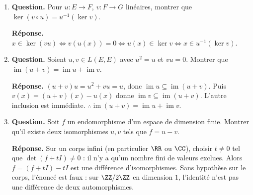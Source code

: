 \documentclass[12pt, a4paper]{article}
\begin{document}
\begin{enumerate}[label=7.\arabic*., start=68]
\begin{minipage}[t]{\linewidth}
\begin{enumerate}[\arabic*.]
En caractéristique $p\leq n$, la question 3 est fausse : $X^p$ est dans le noyau et vérifie $P(0)=P'(0)=0$.
    Pour préciser le noyau et le rang, poser $H=X^p-X$ et $d_q=\min(p,n-pq+1)$, $0\leq q\leq\lfloor n/p\rfloor$.
    Les blocs $H^q\operatorname{Vect}(1,X,\ldots,X^{d_q-1})$ sont stables.
    Si $p>2$, le noyau a pour base les $H^q$, ainsi que les $XH^q$ lorsque $d_q\geq2$ ; l'image a pour base les $X^rH^q$ avec $0\leq r\leq d_q-3$.
    Donc $\operatorname{rg}f=\sum_q\max(d_q-2,0)$.
    Si $p=2$, $f=0$ car $X+1=X-1$.

\end{enumerate}
\end{minipage}

  \item \begin{minipage}[t]{\linewidth}\raggedright
\textbf{Question.} Pour $u:E\to F$, $v:F\to G$ linéaires, montrer que $\ker(v\circ u)=u^{-1}(\ker v)$.
\par\smallskip
\textbf{Réponse.} $x\in\ker(vu)\iff v(u(x))=0\iff u(x)\in\ker v\iff x\in u^{-1}(\ker v)$.
\end{minipage}

  \item \begin{minipage}[t]{\linewidth}\raggedright
\textbf{Question.} Soient $u,v\in L(E,E)$ avec $u^2=u$ et $vu=0$. Montrer que $\operatorname{im}(u+v)=\operatorname{im}u+\operatorname{im}v$.
\par\smallskip
\textbf{Réponse.} $(u+v)u=u^2+vu=u$, donc $\operatorname{im}u\subseteq\operatorname{im}(u+v)$.
    Puis $v(x)=(u+v)(x)-u(x)$ donne $\operatorname{im}v\subseteq\operatorname{im}(u+v)$.
    L'autre inclusion est immédiate.
    $\therefore\operatorname{im}(u+v)=\operatorname{im}u+\operatorname{im}v$.
\end{minipage}

  \item \begin{minipage}[t]{\linewidth}\raggedright
\textbf{Question.} Soit $f$ un endomorphisme d’un espace de dimension finie. Montrer qu’il existe deux isomorphismes $u,v$ tels que $f=u-v$.
\par\smallskip
\textbf{Réponse.} Sur un corps infini (en particulier $\RR$ ou $\CC$), choisir $t\neq0$ tel que $\det(f+tI)\neq0$ : il n'y a qu'un nombre fini de valeurs exclues.
    Alors $f=(f+tI)-tI$ est une différence d'isomorphismes.
    Sans hypothèse sur le corps, l'énoncé est faux : sur $\ZZ/2\ZZ$ en dimension $1$, l'identité n'est pas une différence de deux automorphismes.
\end{minipage}


\end{enumerate}
\end{document}
